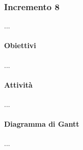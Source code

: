 \subsubsection{Incremento 8}
...
\paragraph{Obiettivi}
...
\paragraph{Attività}
...
\paragraph{Diagramma di Gantt}
...

